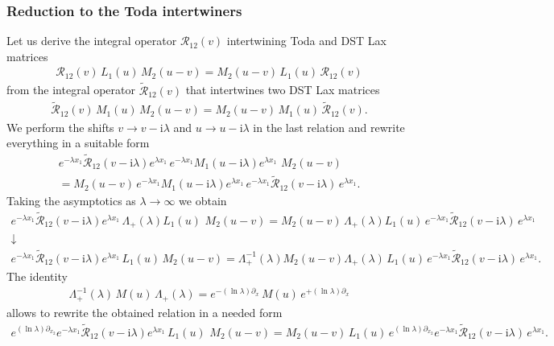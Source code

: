 \documentclass[11pt]{article}
\numberwithin{equation}{section}
\theoremstyle{plain}
\theoremstyle{definition}
\renewcommand{\imath}{\mathrm{i}}
\begin{document}
\subsubsection{Reduction to the Toda intertwiners}


Let us derive the integral operator $\mathcal{R}_{12}(v)$ intertwining 
Toda and DST Lax matrices
\begin{align}
	\mathcal{R}_{12}(v) \, L_1(u) \, M_2(u - v) = M_2(u - v) \, L_1(u) \, \mathcal{R}_{12}(v)
\end{align}
from the integral operator $\widetilde{\mathcal{R}}_{12}(v)$ that 
intertwines two DST Lax matrices
\begin{align}
	\widetilde{\mathcal{R}}_{12}(v) \, M_1(u) \, M_2(u - v) = M_2(u - v) \, M_1(u) \, \widetilde{\mathcal{R}}_{12}(v).
\end{align}
We perform the shifts $v \to v-\imath\lambda$ and 
$u \to u-\imath\lambda$ in the last relation and rewrite 
everything in a suitable form 
\begin{multline*}  
	e^{-\lambda x_1}\widetilde{\mathcal{R}}_{12}(v-\imath\lambda)e^{\lambda x_1} 
	\,e^{-\lambda x_1}M_1(u-\imath\lambda)e^{\lambda x_1}\, 
	\, M_2(u - v) \\ = M_2(u - v) \, 
	e^{-\lambda x_1}M_1(u-\imath\lambda)e^{\lambda x_1} \, 
	e^{-\lambda x_1}\widetilde{\mathcal{R}}_{12}(v-\imath\lambda)\,e^{\lambda x_1}.
\end{multline*}
Taking the asymptotics as $\lambda \to \infty$ we obtain
\begin{gather*}
	e^{-\lambda x_1}\widetilde{\mathcal{R}}_{12}(v-\imath\lambda)e^{\lambda x_1} 
	\,\Lambda_{+}(\lambda)L_1(u)\, 
	\, M_2(u - v) = M_2(u - v)\,\Lambda_{+}(\lambda) L_1(u) \, 
	e^{-\lambda x_1}\widetilde{\mathcal{R}}_{12}(v-\imath\lambda)\,e^{\lambda x_1} \\ 
	\downarrow \\ 
	e^{-\lambda x_1}\widetilde{\mathcal{R}}_{12}(v-\imath\lambda)e^{\lambda x_1} 
	\,L_1(u)\,M_2(u - v) = \Lambda^{-1}_{+}(\lambda)M_2(u - v)\Lambda_{+}(\lambda) \, 
	L_1(u) \, 
	e^{-\lambda x_1}\widetilde{\mathcal{R}}_{12}(v-\imath\lambda)\,e^{\lambda x_1} .
\end{gather*}
The identity
\begin{align}\label{rel}
	\Lambda^{-1}_{+}(\lambda)\,M(u)\,\Lambda_{+}(\lambda) = 
	e^{-(\ln\lambda)\partial_{x}}\,M(u)\,e^{+(\ln\lambda)\partial_{x}}
\end{align}
allows to rewrite the obtained relation in a needed form
\begin{align*}
	e^{(\ln\lambda)\partial_{x_2}}e^{-\lambda x_1}\widetilde{\mathcal{R}}_{12}(v-\imath\lambda)e^{\lambda x_1} 
	\,L_1(u)\, 
	\, M_2(u - v)  = M_2(u - v)\, L_1(u) \, 
	e^{(\ln\lambda)\partial_{x_2}}e^{-\lambda x_1}\widetilde{\mathcal{R}}_{12}(v-\imath\lambda)\,e^{\lambda x_1}.
\end{align*}
\end{document}

